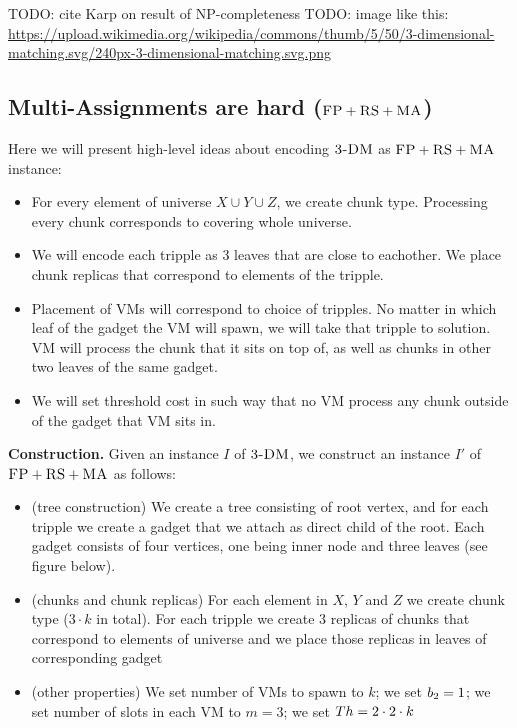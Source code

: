TODO: cite Karp on result of NP-completeness
TODO: image like this: \url{https://upload.wikimedia.org/wikipedia/commons/thumb/5/50/3-dimensional-matching.svg/240px-3-dimensional-matching.svg.png}

\subsection{Multi-Assignments are hard ($\textsc{FP}+\textsc{RS}+\textsc{MA}$)}\label{ssec:fprsma}

Here we will present high-level ideas about encoding $\textsc{3-DM}$ as
 $\textsc{FP}+\textsc{RS}+\textsc{MA}$ instance:

 \begin{itemize} \item For every element of universe $X\cup Y\cup
 Z$, we create chunk type. Processing every chunk corresponds to
 covering whole universe.

 \item We will encode each tripple as $3$ leaves that are close to
 eachother. We place chunk replicas that correspond to elements of the
 tripple.

 \item Placement of VMs will correspond to choice of tripples. No
 matter in which leaf of the gadget the VM will spawn, we will take
 that tripple to solution. VM will process the chunk that it sits on
 top of, as well as chunks in other two leaves of the same gadget.
 
\item We will set threshold cost in such way that no VM process
any chunk outside of the gadget that VM sits in.
\end{itemize}

\textbf{Construction.}
Given an instance $I$ of $\textsc{3-DM}$, we construct an instance $I'$ of
$\textsc{FP}+\textsc{RS}+\textsc{MA}$ as follows:
\begin{itemize}
\item (tree construction) We create a tree consisting of root vertex, and for each tripple
we create a gadget that we attach as direct child of the root. Each
gadget consists of four vertices, one being inner node and three
leaves (see figure below).
\item (chunks and chunk replicas) For each element in $X$, $Y$ and $Z$ we create chunk type
($3 \cdot k$ in total). For each tripple we create $3$ replicas of
chunks that correspond to elements of universe and we place those
replicas in leaves of corresponding gadget
\item (other properties) We set number of VMs to spawn to $k$; we set
$b_2=1$; we set number of slots in each VM to $m=3$; we set
$Th=2 \cdot 2 \cdot k$
\end{itemize}

